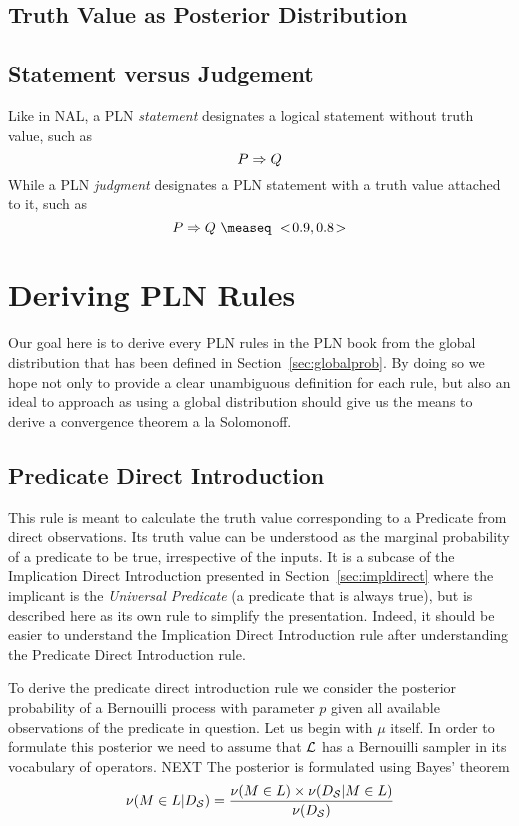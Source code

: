 \documentclass[]{article}
\begin{document}
\subsection{Truth Value as Posterior Distribution}
\label{sec:truthvalue}

\subsection{Statement versus Judgement}
\label{sec:statjudge}
Like in NAL, a PLN \emph{statement} designates a logical statement
without truth value, such as
$$P \Rightarrow Q$$ While a PLN \emph{judgment} designates a PLN statement
with a truth value attached to it, such as
$$P \limp Q\ \measeq\ \STV{0.9}{0.8}$$

\section{Deriving PLN Rules}
\label{sec:derules}
Our goal here is to derive every PLN rules in the PLN book from the
global distribution that has been defined in
Section~\ref{sec:globalprob}.  By doing so we hope not only to
provide a clear unambiguous definition for each rule, but also an
ideal to approach as using a global distribution should give us the
means to derive a convergence theorem a la Solomonoff.

\subsection{Predicate Direct Introduction}
This rule is meant to calculate the truth value corresponding to a
Predicate from direct observations.  Its truth value can be understood
as the marginal probability of a predicate to be true, irrespective of
the inputs.  It is a subcase of the Implication Direct Introduction
presented in Section~\ref{sec:impldirect} where the implicant is the
\emph{Universal Predicate} (a predicate that is always true), but is
described here as its own rule to simplify the presentation.  Indeed,
it should be easier to understand the Implication Direct Introduction
rule after understanding the Predicate Direct Introduction rule.

To derive the predicate direct introduction rule we consider the
posterior probability of a Bernouilli process with parameter $p$ given
all available observations of the predicate in question.  Let us begin
with $\mu$ itself.  In order to formulate this posterior we need to
assume that $\mathcal{L}$ has a Bernouilli sampler in its vocabulary of
operators.  NEXT  The posterior is formulated using Bayes' theorem
$$\nu(M \in L | D_{\mathcal{S}}) = \frac{\nu(M \in L) \times \nu(D_{\mathcal{S}} | M \in
  L)}{\nu(D_{\mathcal{S}})}$$
\end{document}
